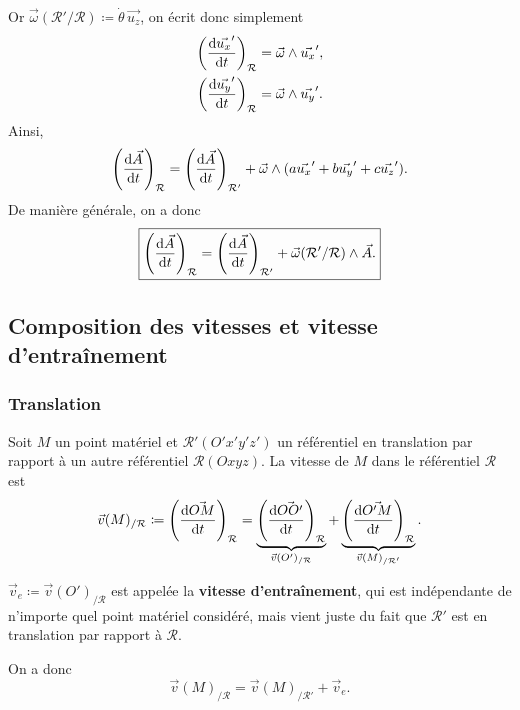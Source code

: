         Or $\vec{\omega}(\mathcal{R}'/\mathcal{R})\coloneqq\dot{\theta}\,\vec{u_z}$, on écrit donc simplement
        \begin{equation}
            \begin{aligned}
                \left(\frac{\mathrm{d}\vec{u_x}'}{\mathrm{d} t}\right)_{\mathcal{R}} &=\vec{\omega}\wedge\vec{u_x}',\\
                \left(\frac{\mathrm{d}\vec{u_y}'}{\mathrm{d} t}\right)_{\mathcal{R}} &=\vec{\omega}\wedge\vec{u_y}'.
            \end{aligned}
        \end{equation}
        Ainsi,
        \begin{equation}
            \left(\frac{\mathrm{d}\vec{A}}{\mathrm{d} t}\right)_{\mathcal{R}}=\left(\frac{\mathrm{d}\vec{A}}{\mathrm{d} t}\right)_{\mathcal{R}'}+\vec{\omega}\wedge(a\vec{u_x}'+b\vec{u_y}'+c\vec{u_z}').
        \end{equation}
        De manière générale, on a donc 
        \begin{equation}
            \boxed{
                \left(\frac{\mathrm{d}\vec{A}}{\mathrm{d} t}\right)_{\mathcal{R}}=\left(\frac{\mathrm{d}\vec{A}}{\mathrm{d} t}\right)_{\mathcal{R}'}+\vec{\omega}(\mathcal{R}'/\mathcal{R})\wedge\vec{A}.
            }
        \end{equation}
    
    \subsection{Composition des vitesses et vitesse d'entraînement}
        \subsubsection{Translation}

            Soit $M$ un point matériel et $\mathcal{R}'(O'x'y'z')$ un référentiel en translation par rapport à un autre référentiel $\mathcal{R}(Oxyz)$. La vitesse de $M$ dans le référentiel $\mathcal{R}$ est
            \begin{equation}
                \vec{v}(M)_{/\mathcal{R}}\coloneqq\left(\frac{\mathrm{d}\vec{OM}}{\mathrm{d} t}\right)_{\mathcal{R}}=\underbrace{\left(\frac{\mathrm{d} \vec{OO'}}{\mathrm{d} t}\right)_{\mathcal{R}}}_{\vec{v}(O')_{/\mathcal{R}}}+\underbrace{\left(\frac{\mathrm{d}\vec{O'M}}{\mathrm{d} t}\right)_{\mathcal{R}}}_{\vec{v}(M)_{/\mathcal{R}'}}.
            \end{equation}
            \begin{definition}
                $\vec{v}_e\coloneqq\vec{v}(O')_{/\mathcal{R}}$ est appelée la \textbf{vitesse d'entraînement}, qui est indépendante de n'importe quel point matériel considéré, mais vient juste du fait que $\mathcal{R}'$ est en translation par rapport à $\mathcal{R}$.
            \end{definition}
            On a donc
            \begin{equation}
                \boxed{
                    \vec{v}(M)_{/\mathcal{R}}=\vec{v}(M)_{/\mathcal{R}'}+\vec{v}_e.
                }
            \end{equation}

